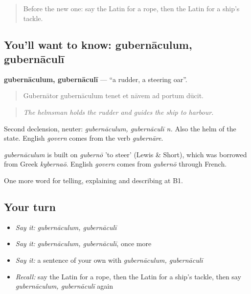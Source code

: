 \begin{quote}
Before the new one: say the Latin for a rope, then the Latin for a ship's tackle.
\end{quote}

\subsection*{You'll want to know: gubernāculum, gubernāculī}
\textbf{gubernāculum, gubernāculī} — \textquotedblleft{}a rudder, a steering oar\textquotedblright{}.

\begin{quote}
Gubernātor gubernāculum tenet et nāvem ad portum dūcit.
\end{quote}

\begin{quote}
\emph{The helmsman holds the rudder and guides the ship to harbour.}
\end{quote}

Second declension, neuter: \emph{gubernāculum, gubernāculī n.} Also the helm of the state. English \emph{govern} comes from the verb \emph{gubernāre}.

\begin{cousinweb}
\emph{gubernāculum} is built on \emph{gubernō} 'to steer' (Lewis \& Short), which was borrowed from Greek \emph{kybernaō}. English \emph{govern} comes from \emph{gubernō} through French.
\end{cousinweb}

\begin{grammarlens}[title={What you've built}]
One more word for telling, explaining and describing at B1.
\end{grammarlens}

\subsection*{Your turn}
\begin{itemize}
\raggedright
  \item \emph{Say it:} \emph{gubernāculum, gubernāculī}
  \item \emph{Say it:} \emph{gubernāculum, gubernāculī}, once more
  \item \emph{Say it:} a sentence of your own with \emph{gubernāculum, gubernāculī}
  \item \emph{Recall:} say the Latin for a rope, then the Latin for a ship's tackle, then say \emph{gubernāculum, gubernāculī} again
\end{itemize}

